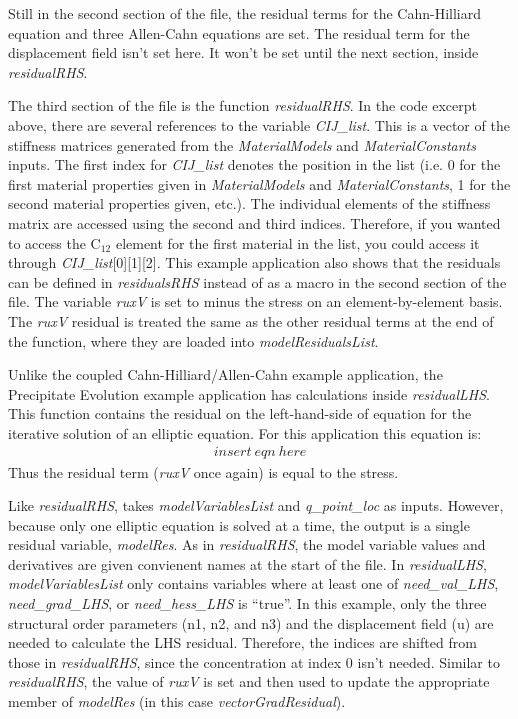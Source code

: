 \documentclass[10pt]{article} %
\begin{document}
Still in the second section of the file, the residual terms for the Cahn-Hilliard equation and three Allen-Cahn equations are set. The residual term for the displacement field isn't set here. It won't be set until the next section, inside \emph{residualRHS}.

The third section of the file is the function \emph{residualRHS}. In the code excerpt above, there are several references to the variable \emph{CIJ\_list}. This is a vector of the stiffness matrices generated from the \emph{MaterialModels} and \emph{MaterialConstants} inputs. The first index for \emph{CIJ\_list} denotes the position in the list (i.e. 0 for the first material properties given in \emph{MaterialModels} and \emph{MaterialConstants}, 1 for the second material properties given, etc.). The individual elements of the stiffness matrix are accessed using the second and third indices. Therefore, if you wanted to access the C$_{12}$ element for the first material in the list, you could access it through \emph{CIJ\_list}[0][1][2]. This example application also shows that the residuals can be defined in \emph{residualsRHS} instead of as a macro in the second section of the file. The variable \emph{ruxV} is set to minus the stress on an element-by-element basis. The \emph{ruxV} residual is treated the same as the other residual terms at the end of the function, where they are loaded into \emph{modelResidualsList}.

Unlike the coupled Cahn-Hilliard/Allen-Cahn example application, the Precipitate Evolution example application has calculations inside \emph{residualLHS}.  This function contains the residual on the left-hand-side of equation for the iterative solution of an elliptic equation. For this application this equation is: 
\begin{align}
insert\ eqn\ here
\end{align}
Thus the residual term (\emph{ruxV} once again) is equal to the stress.

Like \emph{residualRHS}, takes \emph{modelVariablesList} and  \emph{q\_point\_loc} as inputs. However, because only one elliptic equation is solved at a time, the output is a single residual variable, \emph{modelRes}. As in \emph{residualRHS}, the model variable values and derivatives are given convienent names at the start of the file. In \emph{residualLHS}, \emph{modelVariablesList} only contains variables where at least one of \emph{need\_val\_LHS}, \emph{need\_grad\_LHS}, or \emph{need\_hess\_LHS} is ``true''. In this example, only the three structural order parameters (n1, n2, and n3) and the displacement field (u) are needed to calculate the LHS residual. Therefore, the indices are shifted from those in \emph{residualRHS}, since the concentration at index 0 isn't needed. Similar to \emph{residualRHS}, the value of \emph{ruxV} is set and then used to update the appropriate member of \emph{modelRes} (in this case \emph{vectorGradResidual}).
\end{document}
